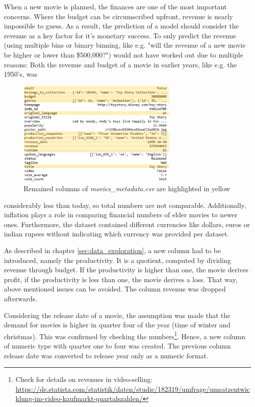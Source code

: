 When a new movie is planned, the finances are one of the most important concerns. Where the budget can be circumscribed upfront, revenue is nearly impossible to guess. As a result, the prediction of a model should consider the revenue as a key factor for it's monetary success. To only predict the revenue (using multiple bins or binary binning, like e.g. "will the revenue of a new movie be higher or lower than \$500,000?") would not have worked out due to multiple reasons: Both the revenue and budget of a movie in earlier years, like e.g. the 1950's, was
\begin{figure}
	\includegraphics[width=0.7\textwidth]{images/3_metadata_columns.png}
	\caption{Remained columns of \textit{movies\_metadata.csv} are highlighted in yellow}
	\label{img:mm_columns}
\end{figure}
\FloatBarrier
 considerably less than today, so total numbers are not comparable. Additionally, inflation plays a role in comparing financial numbers of elder movies to newer ones. Furthermore, the dataset contained different currencies like dollars, euros or indian rupees without indicating which currency was provided per dataset.
 
As described in chapter \ref{sec:data_exploration}, a new column had to be introduced, namely the productivity. It is a quotient, computed by dividing revenue through budget. If the productivity is higher than one, the movie derives profit, if the productivity is less than one, the movie derives a loss. That way, above mentioned issues can be avoided. The column revenue was dropped afterwards.

Considering the release date of a movie, the assumption was made that the demand for movies is higher in quarter four of the year (time of winter and christmas). This was confirmed by checking the numbers\footnote{Check for details on revenues in video-selling: \hyperref{https://de.statista.com/statistik/daten/studie/182319/umfrage/umsatzentwicklung-im-video-kaufmarkt-quartalszahlen/}{link}{Statista revenue movies}{https://de.statista.com/statistik/daten/studie/182319/umfrage/umsatzentwicklung-im-video-kaufmarkt-quartalszahlen/}}. Hence, a new column of numeric type with quarter one to four was created. The previous column release date was converted to release year only as a numeric format.

